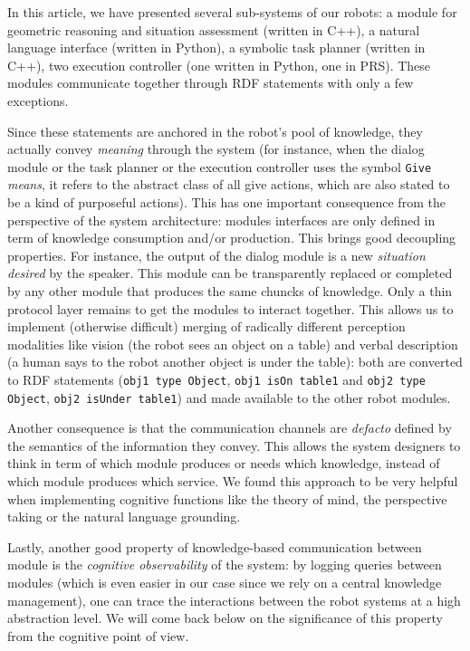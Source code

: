 \documentclass[letterpaper, 10 pt, conference]{ieeeconf}  %
\begin{document}
In this article, we have presented several sub-systems of our robots: a module for geometric
reasoning and situation assessment (written in C++), a natural
language interface (written in Python), a symbolic task planner (written in
C++), two execution controller (one written in Python, one in PRS). These
modules communicate together through RDF statements with only a few exceptions.

Since these statements are anchored in the robot's pool of knowledge, they
actually convey \emph{meaning} through the system (for instance, when the
dialog module or the task planner or the execution controller uses the symbol
{\tt Give} \emph{means}, it refers to the abstract class of all give actions, which are also stated
to be a kind of purposeful actions). This has one important consequence from
the perspective of the system architecture: modules interfaces are only defined
in term of knowledge consumption and/or production. This brings good decoupling
properties. For instance, the output of the dialog module is a new
\emph{situation desired} by the speaker. This module can be transparently
replaced or completed by any other module that produces the same chuncks of
knowledge. Only a thin protocol layer remains to get the modules to interact
together. This allows us to implement (otherwise difficult) merging of
radically different perception modalities like vision (the robot sees an object on
a table) and verbal description (a human says to the robot another object is
under the table): both are converted to RDF statements ({\tt obj1 type Object},
{\tt obj1 isOn table1} and {\tt obj2 type Object}, {\tt obj2 isUnder table1})
and made available to the other robot modules.

Another consequence is that the communication channels are {\it
defacto} defined by the semantics of the information they
convey. This allows the system designers to think in term of which module
produces or needs which knowledge, instead of which module produces which
service. We found this approach to be very helpful when implementing cognitive
functions like the theory of mind, the perspective taking or the natural
language grounding.

Lastly, another good property of knowledge-based communication between module
is the \emph{cognitive observability} of the system: by logging queries between
modules (which is even easier in our case since we rely on a central knowledge
management), one can trace the interactions between the robot systems at a high
abstraction level. We will come back below on the significance of this property
from the cognitive point of view.
\end{document}
